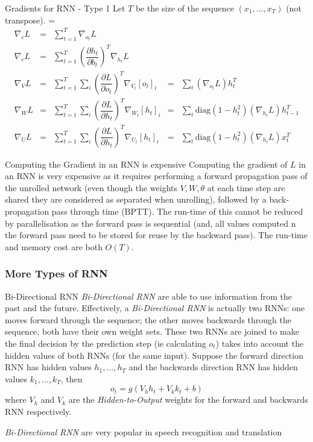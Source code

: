 \documentclass[11pt,a4paper]{article}
\begin{document}
  \begin{proposition}{Gradients for RNN - Type 1}
    Let $T$ be the size of the sequence $(x_1,\dots,x_T)$ (not transpose).
    \everymath={\displaystyle}
    \[\begin{array}{rclcl}
      \nabla_cL&=&\sum_{t=1}^T\nabla_{o_t}L\\
      \nabla_cL&=&\sum_{t=1}^T\left(\dfrac{\partial h_t}{\partial b_t}\right)^T\nabla_{h_t}L\\
      \nabla_VL&=&\sum_{t=1}^T\sum_i\left(\dfrac{\partial L}{\partial o_t}\right)^T\nabla_{V_t}[o_t]_i&=&\sum_t(\nabla_{o_t}L)h_t^T\\
      \nabla_WL&=&\sum_{t=1}^T\sum_i\left(\dfrac{\partial L}{\partial h_t}\right)^T\nabla_{W_t}[h_t]_i&=&\sum_t\text{diag}(1-h_t^2)(\nabla_{h_t}L)h_{t-1}^T\\
      \nabla_UL&=&\sum_{t=1}^T\sum_i\left(\dfrac{\partial L}{\partial h_t}\right)^T\nabla_{U_t}[h_t]_i&=&\sum_t\text{diag}(1-h_t^2)(\nabla_{h_t}L)x_t^T
    \end{array}\]
  \end{proposition}

  \begin{remark}{Computing the Gradient in an RNN is expensive}
    Computing the gradient of $L$ in an RNN is very expensive as it requires performing a forward propagation pass of the unrolled network (even though the weights $V,W,\theta$ at each time step are shared they are considered as separated when unrolling), followed by a back-propagation pass through time (BPTT). The run-time of this cannot be reduced by parallelisation as the forward pass is sequential (and, all values computed n the forward pass need to be stored for reuse by the backward pass). The run-time and memory cost are both $O(T)$.
  \end{remark}

  \subsubsection*{More Types of RNN}

  \begin{definition}{Bi-Directional RNN}
    \textit{Bi-Directional RNN} are able to use information from the past and the future. Effectively, a \textit{Bi-Directional RNN} is actually two RNNs: one moves forward through the sequence; the other moves backwards through the sequence, both have their own weight sets. These two RNNs are joined to make the final decision by the prediction step (ie calculating $o_t$) takes into account the hidden values of both RNNs (for the same input). Suppose the forward direction RNN has hidden values $h_1,\dots,h_T$ and the backwards direction RNN has hidden values $k_1,\dots,k_T$, then
    \[ o_t=g(V_hh_t+V_kk_t+b) \]
    where $V_h$ and $V_k$ are the \textit{Hidden-to-Output} weights for the forward and backwards RNN respectively.
    \par \textit{Bi-Directional RNN} are very popular in speech recognition and translation
  \end{definition}
\end{document}

